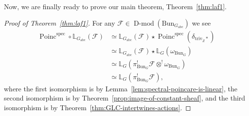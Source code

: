 \documentclass[11pt]{amsart}
\newcommand{\cF}{\mathcal{F}}
\newcommand{\triv}{\mathrm{triv}}
\newcommand{\spec}{\mathrm{spec}}
\newcommand{\Bun}{{\mathrm{Bun}}}
\newcommand{\Poinc}{\operatorname{Poinc}}
\newcommand{\abc}{{\mathrm{abc}}}
\DeclareMathOperator{\Dmod}{D-mod}
\theoremstyle{remark}
\theoremstyle{definition}
\begin{document}
Now, we are finally ready to prove our main theorem, Theorem~\ref{thm:laf1}.
\begin{proof}[Proof of Theorem~\ref{thm:laf1}]
For any $\cF\in\Dmod(\Bun_{G_\abc})$ we see
    \begin{align*}
        \Poinc^\spec\circ\mathbb L_{G_\abc}(\cF)&\simeq\mathbb L_{G_\abc}(\cF)\star\Poinc^\spec(\delta_{\triv_{\check Z}*})\\
        &\simeq\mathbb L_{G_\abc}(\cF)\star\mathbb L_G(\omega_{\Bun_G})\\
        &\simeq\mathbb L_G(\pi_{\Bun_G}^!\cF\otimes^!\omega_{\Bun_G})\\
        &\simeq\mathbb L_G(\pi_{\Bun_G}^!\cF),
    \end{align*}
    where the first isomorphism is by Lemma~\ref{lem:spectral-poincare-is-linear}, the second isomorphism is by Theorem~\ref{prop:image-of-constant-sheaf}, and the third isomorphism is by Theorem~\ref{thm:GLC-intertwines-actions}.
\end{proof}



\end{document}

